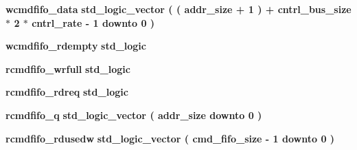 \begin{DoxyCompactItemize}
\item 
{\bf wcmdfifo\+\_\+data} {\bfseries \textcolor{comment}{std\+\_\+logic\+\_\+vector}\textcolor{vhdlchar}{ }\textcolor{vhdlchar}{(}\textcolor{vhdlchar}{ }\textcolor{vhdlchar}{(}\textcolor{vhdlchar}{ }\textcolor{vhdlchar}{ }\textcolor{vhdlchar}{ }\textcolor{vhdlchar}{ }{\bfseries {\bf addr\+\_\+size}} \textcolor{vhdlchar}{+}\textcolor{vhdlchar}{ } \textcolor{vhdldigit}{1} \textcolor{vhdlchar}{ }\textcolor{vhdlchar}{)}\textcolor{vhdlchar}{ }\textcolor{vhdlchar}{+}\textcolor{vhdlchar}{ }\textcolor{vhdlchar}{ }\textcolor{vhdlchar}{ }{\bfseries {\bf cntrl\+\_\+bus\+\_\+size}} \textcolor{vhdlchar}{$\ast$}\textcolor{vhdlchar}{ } \textcolor{vhdldigit}{2} \textcolor{vhdlchar}{$\ast$}\textcolor{vhdlchar}{ }\textcolor{vhdlchar}{ }\textcolor{vhdlchar}{ }{\bfseries {\bf cntrl\+\_\+rate}} \textcolor{vhdlchar}{-\/}\textcolor{vhdlchar}{ } \textcolor{vhdldigit}{1} \textcolor{vhdlchar}{ }\textcolor{keywordflow}{downto}\textcolor{vhdlchar}{ }\textcolor{vhdlchar}{ } \textcolor{vhdldigit}{0} \textcolor{vhdlchar}{ }\textcolor{vhdlchar}{)}\textcolor{vhdlchar}{ }} 
\item 
{\bf wcmdfifo\+\_\+rdempty} {\bfseries \textcolor{comment}{std\+\_\+logic}\textcolor{vhdlchar}{ }} 
\item 
{\bf rcmdfifo\+\_\+wrfull} {\bfseries \textcolor{comment}{std\+\_\+logic}\textcolor{vhdlchar}{ }} 
\item 
{\bf rcmdfifo\+\_\+rdreq} {\bfseries \textcolor{comment}{std\+\_\+logic}\textcolor{vhdlchar}{ }} 
\item 
{\bf rcmdfifo\+\_\+q} {\bfseries \textcolor{comment}{std\+\_\+logic\+\_\+vector}\textcolor{vhdlchar}{ }\textcolor{vhdlchar}{(}\textcolor{vhdlchar}{ }\textcolor{vhdlchar}{ }\textcolor{vhdlchar}{ }\textcolor{vhdlchar}{ }{\bfseries {\bf addr\+\_\+size}} \textcolor{vhdlchar}{ }\textcolor{keywordflow}{downto}\textcolor{vhdlchar}{ }\textcolor{vhdlchar}{ } \textcolor{vhdldigit}{0} \textcolor{vhdlchar}{ }\textcolor{vhdlchar}{)}\textcolor{vhdlchar}{ }} 
\item 
{\bf rcmdfifo\+\_\+rdusedw} {\bfseries \textcolor{comment}{std\+\_\+logic\+\_\+vector}\textcolor{vhdlchar}{ }\textcolor{vhdlchar}{(}\textcolor{vhdlchar}{ }\textcolor{vhdlchar}{ }\textcolor{vhdlchar}{ }\textcolor{vhdlchar}{ }{\bfseries {\bf cmd\+\_\+fifo\+\_\+size}} \textcolor{vhdlchar}{-\/}\textcolor{vhdlchar}{ } \textcolor{vhdldigit}{1} \textcolor{vhdlchar}{ }\textcolor{keywordflow}{downto}\textcolor{vhdlchar}{ }\textcolor{vhdlchar}{ } \textcolor{vhdldigit}{0} \textcolor{vhdlchar}{ }\textcolor{vhdlchar}{)}\textcolor{vhdlchar}{ }} 

\end{DoxyCompactItemize}
